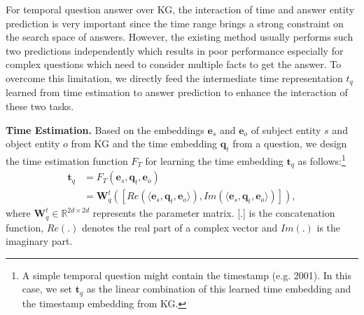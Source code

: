 \documentclass[11pt]{article}
\newcommand{\xhdr}[1]{{\noindent\bfseries #1}.}
\newcommand{\gt}[1]{{{\textcolor{cyan}{[gt: #1]}}}}
\begin{document}



For temporal question answer over KG, the interaction of time and answer entity prediction is very important since the time range brings a strong constraint on the search space of answers. However, the existing method \cite{saxena2021question} usually performs such two predictions independently which results in poor performance especially for complex questions which need to consider multiple facts to get the answer. To overcome this limitation, we directly feed the intermediate time representation $t_q$ learned from time estimation to answer prediction to enhance the interaction of these two tasks.

\noindent \textbf{Time Estimation.}
Based on the embeddings $\bm{e}_s$ and $\bm{e}_o$ of subject entity $s$ and object entity $o$ from KG and the time embedding $\bm{q}_{t}$ from a question, we design the time estimation function $F_T$ for learning the time embedding $\bm{t}_q$ as follows:\footnote{A simple temporal question might contain the timestamp (e.g. 2001). In this case, we set $\bm{t}_q$ as the linear combination of this learned time embedding and the timestamp embedding from KG.} 
\begin{equation}
\begin{aligned}
\bm{t}_q &=  F_T(\bm{e}_s, \bm{q}_{t}, \bm{e}_o) \\
 & =  \bm{W}_{q}^{t}([Re(\langle \bm{e}_s, \bm{q}_{t}, \bm{e}_o\rangle), Im(\langle \bm{e}_s, \bm{q}_{t}, \bm{e}_o\rangle)]),
\end{aligned}
\label{eqa_time_emb}
\end{equation}
where $\bm{W}_{q}^{t} \in \mathbb{R}^{2d\times 2d}$ represents the parameter matrix. [.] is the concatenation function, $Re(.)$ denotes the real part of a complex vector and $Im(.)$ is the imaginary part.
\end{document}
